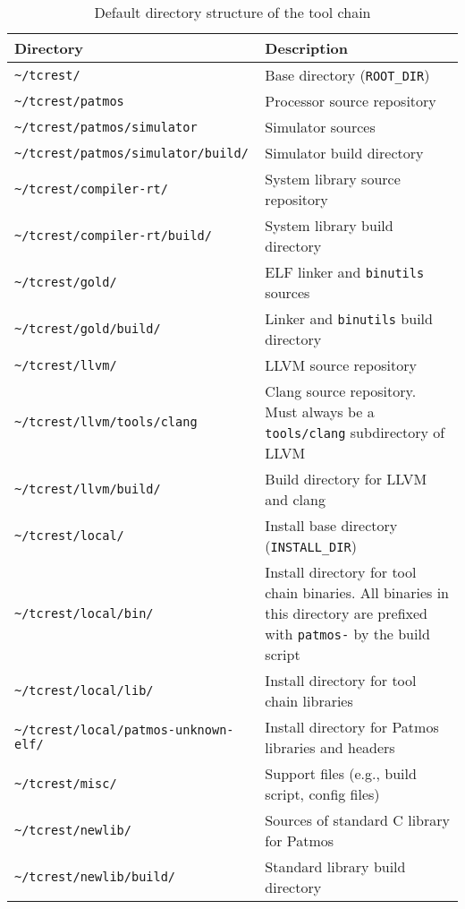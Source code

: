 \newcommand{\rootdir}[1]{\texttt{\textasciitilde/tcrest/#1}}
\newcommand{\myspace}{2mm}
\begin{table}
\centering
\begin{tabularx}{\textwidth}{lX}
Directory & Description \\ \hline
\rootdir{} & Base directory (\texttt{ROOT\_DIR}) \\ [\myspace]
\rootdir{patmos} &  Processor source repository \\ [\myspace]
\rootdir{patmos/simulator} & Simulator sources \\ [\myspace]
\rootdir{patmos/simulator/build/} & Simulator build directory \\ [\myspace]
\rootdir{compiler-rt/} & System library source repository  \\ [\myspace]
\rootdir{compiler-rt/build/} & System library build directory \\ [\myspace]
\rootdir{gold/} & ELF linker and \texttt{binutils} sources \\ [\myspace] 
\rootdir{gold/build/} & Linker and \texttt{binutils} build directory \\ [\myspace]
\rootdir{llvm/} & LLVM source repository \\ [\myspace] 
\rootdir{llvm/tools/clang} & Clang source repository. Must always be a 
			    \texttt{tools/clang} subdirectory of LLVM \\ [\myspace]
\rootdir{llvm/build/} & Build directory for LLVM and clang \\ [\myspace] 
\rootdir{local/} & Install base directory (\texttt{INSTALL\_DIR}) \\ [\myspace]
\rootdir{local/bin/} & Install directory for tool chain binaries. 
                       All binaries in this directory are prefixed 
		       with \texttt{patmos-} by the build script \\ [\myspace]
\rootdir{local/lib/} & Install directory for tool chain libraries \\ [\myspace] 
\rootdir{local/patmos-unknown-elf/} & Install directory for Patmos 
                                       libraries and headers \\ [\myspace]
\rootdir{misc/} & Support files (e.g., build script, config files) \\ [\myspace]
\rootdir{newlib/} & Sources of standard C library for Patmos \\ [\myspace]
\rootdir{newlib/build/} & Standard library build directory 
\end{tabularx}
\caption{Default directory structure of the tool chain}
\label{tab:directories}
\end{table}

